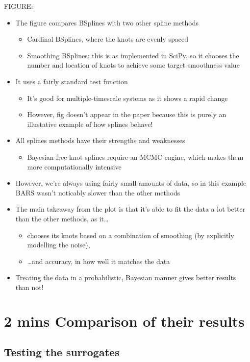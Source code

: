 \documentclass[11pt]{article}
\begin{document}
FIGURE:
\begin{itemize}
\item The figure compares BSplines with two other spline methods
\begin{itemize}
\item Cardinal BSplines, where the knots are evenly spaced
\item Smoothing BSplines; this is as implemented in SciPy, so it chooses the number and location of knots to achieve some target smoothness value
\end{itemize}
\item It uses a fairly standard test function
\begin{itemize}
\item It's good for multiple-timescale systems as it shows a rapid change
\item However, fig doesn't appear in the paper because this is purely an illustative example of how splines behave!
\end{itemize}
\item All splines methods have their strengths and weaknesses
\begin{itemize}
\item Bayesian free-knot splines require an MCMC engine, which makes them more computationally intensive
\end{itemize}
\item However, we're always using fairly small amounts of data, so in this example BARS wasn't noticably slower than the other methods
\item The main takeaway from the plot is that it's able to fit the data a lot better than the other methods, as it\ldots{}
\begin{itemize}
\item chooses its knots based on a combination of smoothing (by explicitly modelling the noise),
\item \ldots{}and accuracy, in how well it matches the data
\end{itemize}
\item Treating the data in a probabilistic, Bayesian manner gives better results than not!
\end{itemize}

\section{2 mins Comparison of their results}
\label{sec:org726ce5a}
\subsection{Testing the surrogates}
\label{sec:org3fdb2b1}
\end{document}
